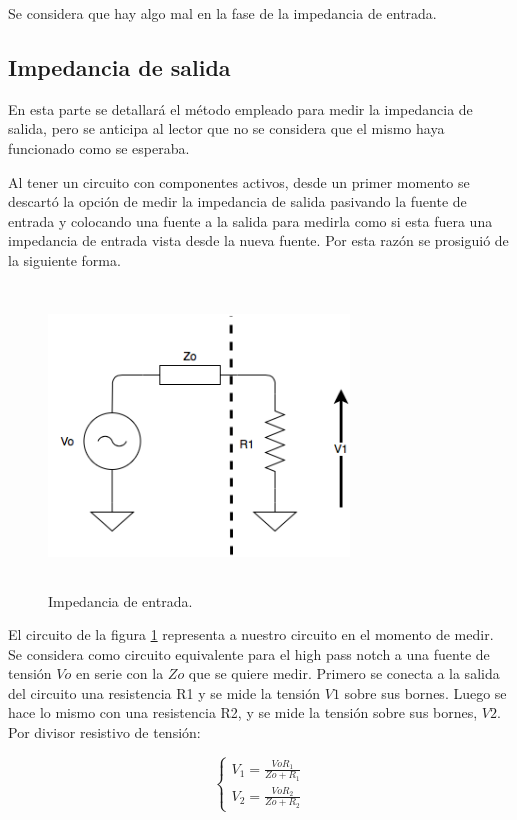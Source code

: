 Se considera que hay algo mal en la fase de la impedancia de entrada.

\subsection{Impedancia de salida}

En esta parte se detallar\'a el m\'etodo empleado para medir la impedancia de salida, pero se anticipa al lector que no se considera que el mismo haya funcionado como se esperaba. 

Al tener un circuito con componentes activos, desde un primer momento se descart\'o la opci\'on de medir la impedancia de salida pasivando la fuente de entrada y colocando una fuente a la salida para medirla como si esta fuera una impedancia de entrada vista desde la nueva fuente. Por esta raz\'on se prosigui\'o de la siguiente forma.

\begin{figure}[H] %
	\centering
	\includegraphics[width=8cm,height=8cm,keepaspectratio]{../EJ1/00GRAFICOS/zout.png}
	\caption{Impedancia de entrada.}
	\label{zout}
\end{figure}

El circuito de la figura \ref{zout} representa a nuestro circuito en el momento de medir. Se considera como circuito equivalente para el high pass notch a una fuente de tensi\'on $Vo$ en serie con la $Zo$ que se quiere medir. Primero se conecta a la salida del circuito una resistencia R1 y se mide la tensi\'on $V1$ sobre sus bornes. Luego se hace lo mismo con una resistencia R2, y se mide la tensi\'on sobre sus bornes, $V2$. Por divisor resistivo de tensi\'on:

\begin{equation}
\begin{cases}
	V_1 = \frac{Vo R_1}{Zo + R_1}\\
	V_2 = \frac{Vo R_2}{Zo + R_2}
\end{cases}
\label{v1v2}
\end{equation}

